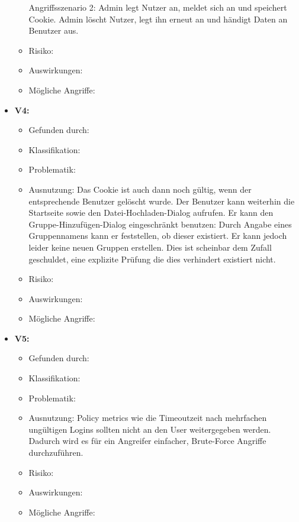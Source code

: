 \documentclass[12pt,DIV14,BCOR10mm,a4paper,parskip=half-,headsepline,headinclude,english,ngerman,bibliography=totocnumbered]{scrreprt}
\begin{document}
\begin{itemize}
\begin{itemize}
    Angriffsszenario 2: Admin legt Nutzer an, meldet sich an und speichert Cookie. Admin löscht Nutzer, legt ihn erneut an und händigt Daten an Benutzer aus.
  \item Risiko: 
  \item Auswirkungen: 
  \item Mögliche Angriffe:
  \end{itemize}

  \hypertarget{vulnerability4}{}
  \item \textbf{V4: }
  \begin{itemize}
  \item Gefunden durch:
  \item Klassifikation: 
  \item Problematik:
  \item Ausnutzung: Das Cookie ist auch dann noch gültig, wenn der entsprechende Benutzer gelöscht wurde. Der Benutzer kann weiterhin die Startseite sowie den Datei-Hochladen-Dialog aufrufen. Er kann den Gruppe-Hinzufügen-Dialog eingeschränkt benutzen: Durch Angabe eines Gruppennamens kann er feststellen, ob dieser existiert. Er kann jedoch leider keine neuen Gruppen erstellen. Dies ist scheinbar dem Zufall geschuldet, eine explizite Prüfung die dies verhindert existiert nicht.
  \item Risiko: 
  \item Auswirkungen: 
  \item Mögliche Angriffe:
  \end{itemize}

  \hypertarget{vulnerability5}{}
  \item \textbf{V5: }
  \begin{itemize}
  \item Gefunden durch:
  \item Klassifikation: 
  \item Problematik:
  \item Ausnutzung: Policy metrics wie die Timeoutzeit nach mehrfachen ungültigen Logins sollten nicht an den User weitergegeben werden. Dadurch wird es für ein Angreifer einfacher, Brute-Force Angriffe durchzuführen. \autocite[Loc. 5087]{book:wahh}
  \item Risiko: 
  \item Auswirkungen: 
  \item Mögliche Angriffe:
  \end{itemize}


\end{itemize}
\end{document}
